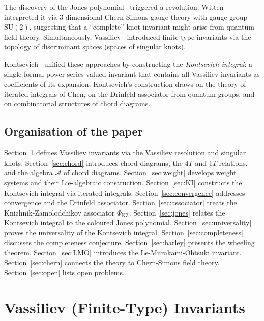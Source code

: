 \documentclass[12pt,a4paper]{amsart}
\theoremstyle{definition}
\newcommand{\Ac}{\mathcal{A}}
\begin{document}
The discovery of the Jones polynomial~\cite{jones1985} triggered a revolution:
Witten~\cite{witten1989} interpreted it via $3$-dimensional Chern-Simons
gauge theory with gauge group $\mathrm{SU}(2)$, suggesting that a ``complete''
knot invariant might arise from quantum field theory.  Simultaneously,
Vassiliev~\cite{vassiliev1990} introduced finite-type invariants via the
topology of discriminant spaces (spaces of singular knots).

Kontsevich~\cite{kontsevich1993} unified these approaches by constructing
the \emph{Kontsevich integral}: a single formal-power-series-valued invariant
that contains all Vassiliev invariants as coefficients of its expansion.
Kontsevich's construction draws on the theory of iterated integrals of Chen,
on the Drinfeld associator from quantum groups, and on combinatorial structures
of chord diagrams.

\subsection*{Organisation of the paper}

Section~\ref{sec:vassiliev} defines Vassiliev invariants via the
Vassiliev resolution and singular knots.
Section~\ref{sec:chord} introduces chord diagrams, the $4T$ and $1T$ relations,
and the algebra $\Ac$ of chord diagrams.
Section~\ref{sec:weight} develops weight systems and their Lie-algebraic
construction.
Section~\ref{sec:KI} constructs the Kontsevich integral via iterated integrals.
Section~\ref{sec:convergence} addresses convergence and the Drinfeld associator.
Section~\ref{sec:associator} treats the Knizhnik-Zamolodchikov associator $\Phi_{\mathrm{KZ}}$.
Section~\ref{sec:jones} relates the Kontsevich integral to the coloured Jones polynomial.
Section~\ref{sec:universality} proves the universality of the Kontsevich integral.
Section~\ref{sec:completeness} discusses the completeness conjecture.
Section~\ref{sec:barley} presents the wheeling theorem.
Section~\ref{sec:LMO} introduces the Le-Murakami-Ohtsuki invariant.
Section~\ref{sec:chern} connects the theory to Chern-Simons field theory.
Section~\ref{sec:open} lists open problems.

\section{Vassiliev (Finite-Type) Invariants}\label{sec:vassiliev}
\end{document}
